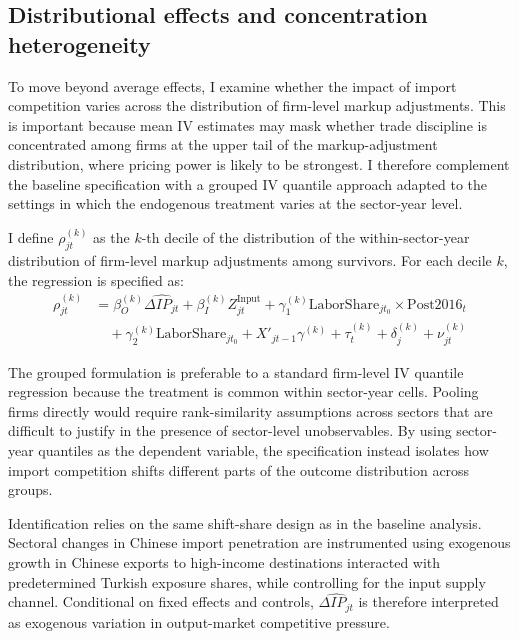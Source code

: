\documentclass[12pt]{article}
\begin{document}
\subsection{Distributional effects and concentration heterogeneity}

To move beyond average effects, I examine whether the impact of import competition varies across the distribution of firm-level markup adjustments. This is important because mean IV estimates may mask whether trade discipline is concentrated among firms at the upper tail of the markup-adjustment distribution, where pricing power is likely to be strongest. I therefore complement the baseline specification with a grouped IV quantile approach \textcite{chetverikovIVQuantileRegression2016} adapted to the settings in which the endogenous treatment varies at the sector-year level. 

I define $\rho_{jt}^{(k)}$ as the $k$-th decile of the distribution of the within-sector-year distribution of firm-level markup adjustments among survivors. For each decile $k$, the regression is specified as:
\begin{equation}
\begin{aligned}
\rho_{jt}^{(k)} &= \beta_O^{(k)} \widehat{\Delta IP_{jt}} + \beta_I^{(k)} Z_{jt}^{\text{Input}} + \gamma_1^{(k)} \text{LaborShare}_{jt_0} \times \text{Post2016}_t \\
&\quad + \gamma_2^{(k)} \text{LaborShare}_{jt_0} + X'_{jt-1} \gamma^{(k)} + \tau_t^{(k)} + \delta_j^{(k)} + \nu_{jt}^{(k)}
\end{aligned}
\end{equation}

The grouped formulation is preferable to a standard firm-level IV quantile regression because the treatment is common within sector-year cells. Pooling firms directly would require rank-similarity assumptions across sectors that are difficult to justify in the presence of sector-level unobservables. By using sector-year quantiles as the dependent variable, the specification instead isolates how import competition shifts different parts of the outcome distribution across groups. 

Identification relies on the same shift-share design as in the baseline analysis. Sectoral changes in Chinese import penetration are instrumented using exogenous growth in Chinese exports to high-income destinations interacted with predetermined Turkish exposure shares, while controlling for the input supply channel. Conditional on fixed effects and controls, $\widehat{\Delta IP_{jt}}$ is therefore interpreted as exogenous variation in output-market competitive pressure. 
\end{document}

